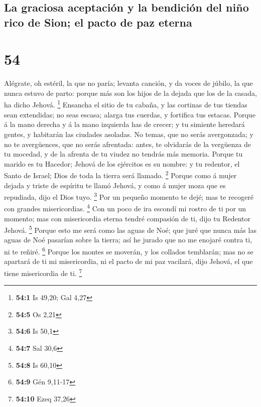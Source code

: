\hypertarget{la-graciosa-aceptaciuxf3n-y-la-bendiciuxf3n-del-niuxf1o-rico-de-sion-el-pacto-de-paz-eterna}{%
\subsection{La graciosa aceptación y la bendición del niño rico de Sion;
el pacto de paz
eterna}\label{la-graciosa-aceptaciuxf3n-y-la-bendiciuxf3n-del-niuxf1o-rico-de-sion-el-pacto-de-paz-eterna}}

\hypertarget{section-53}{%
\section{54}\label{section-53}}

 Alégrate, oh estéril, la que no paría; levanta canción, y
da voces de júbilo, la que nunca estuvo de parto: porque más son los
hijos de la dejada que los de la casada, ha dicho Jehová. \footnote{\textbf{54:1}
  Is 49,20; Gal 4,27}  Ensancha el sitio de tu cabaña, y
las cortinas de tus tiendas sean extendidas; no seas escasa; alarga tus
cuerdas, y fortifica tus estacas.  Porque á la mano
derecha y á la mano izquierda has de crecer; y tu simiente heredará
gentes, y habitarán las ciudades asoladas.  No temas, que
no serás avergonzada; y no te avergüences, que no serás afrentada:
antes, te olvidarás de la vergüenza de tu mocedad, y de la afrenta de tu
viudez no tendrás más memoria.  Porque tu marido es tu
Hacedor; Jehová de los ejércitos es su nombre: y tu redentor, el Santo
de Israel; Dios de toda la tierra será llamado. \footnote{\textbf{54:5}
  Os 2,21}  Porque como á mujer dejada y triste de
espíritu te llamó Jehová, y como á mujer moza que es repudiada, dijo el
Dios tuyo. \footnote{\textbf{54:6} Is 50,1}  Por un
pequeño momento te dejé; mas te recogeré con grandes misericordias.
\footnote{\textbf{54:7} Sal 30,6}  Con un poco de ira
escondí mi rostro de ti por un momento; mas con misericordia eterna
tendré compasión de ti, dijo tu Redentor Jehová. \footnote{\textbf{54:8}
  Is 60,10}  Porque esto me será como las aguas de Noé;
que juré que nunca más las aguas de Noé pasarían sobre la tierra; así he
jurado que no me enojaré contra ti, ni te reñiré. \footnote{\textbf{54:9}
  Gén 9,11-17}  Porque los montes se moverán, y los
collados temblarán; mas no se apartará de ti mi misericordia, ni el
pacto de mi paz vacilará, dijo Jehová, el que tiene misericordia de ti.
\footnote{\textbf{54:10} Ezeq 37,26}

